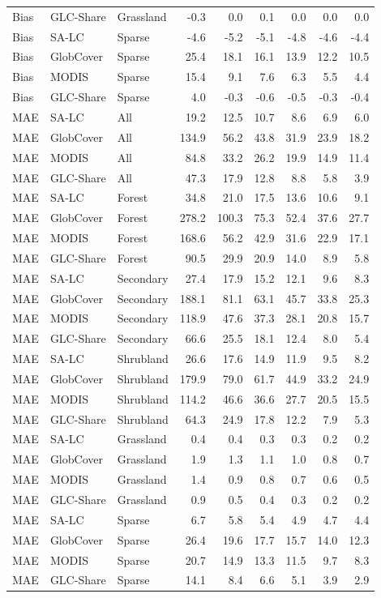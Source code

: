 \begin{longtable}{lllrrrrrr}
  Bias & GLC-Share & Grassland & -0.3 & 0.0 & 0.1 & 0.0 & 0.0 & 0.0 \\ 
  Bias & SA-LC & Sparse & -4.6 & -5.2 & -5.1 & -4.8 & -4.6 & -4.4 \\ 
  Bias & GlobCover & Sparse & 25.4 & 18.1 & 16.1 & 13.9 & 12.2 & 10.5 \\ 
  Bias & MODIS & Sparse & 15.4 & 9.1 & 7.6 & 6.3 & 5.5 & 4.4 \\ 
  Bias & GLC-Share & Sparse & 4.0 & -0.3 & -0.6 & -0.5 & -0.3 & -0.4 \\ 
  MAE & SA-LC & All & 19.2 & 12.5 & 10.7 & 8.6 & 6.9 & 6.0 \\ 
  MAE & GlobCover & All & 134.9 & 56.2 & 43.8 & 31.9 & 23.9 & 18.2 \\ 
  MAE & MODIS & All & 84.8 & 33.2 & 26.2 & 19.9 & 14.9 & 11.4 \\ 
  MAE & GLC-Share & All & 47.3 & 17.9 & 12.8 & 8.8 & 5.8 & 3.9 \\ 
  MAE & SA-LC & Forest & 34.8 & 21.0 & 17.5 & 13.6 & 10.6 & 9.1 \\ 
  MAE & GlobCover & Forest & 278.2 & 100.3 & 75.3 & 52.4 & 37.6 & 27.7 \\ 
  MAE & MODIS & Forest & 168.6 & 56.2 & 42.9 & 31.6 & 22.9 & 17.1 \\ 
  MAE & GLC-Share & Forest & 90.5 & 29.9 & 20.9 & 14.0 & 8.9 & 5.8 \\ 
  MAE & SA-LC & Secondary & 27.4 & 17.9 & 15.2 & 12.1 & 9.6 & 8.3 \\ 
  MAE & GlobCover & Secondary & 188.1 & 81.1 & 63.1 & 45.7 & 33.8 & 25.3 \\ 
  MAE & MODIS & Secondary & 118.9 & 47.6 & 37.3 & 28.1 & 20.8 & 15.7 \\ 
  MAE & GLC-Share & Secondary & 66.6 & 25.5 & 18.1 & 12.4 & 8.0 & 5.4 \\ 
  MAE & SA-LC & Shrubland & 26.6 & 17.6 & 14.9 & 11.9 & 9.5 & 8.2 \\ 
  MAE & GlobCover & Shrubland & 179.9 & 79.0 & 61.7 & 44.9 & 33.2 & 24.9 \\ 
  MAE & MODIS & Shrubland & 114.2 & 46.6 & 36.6 & 27.7 & 20.5 & 15.5 \\ 
  MAE & GLC-Share & Shrubland & 64.3 & 24.9 & 17.8 & 12.2 & 7.9 & 5.3 \\ 
  MAE & SA-LC & Grassland & 0.4 & 0.4 & 0.3 & 0.3 & 0.2 & 0.2 \\ 
  MAE & GlobCover & Grassland & 1.9 & 1.3 & 1.1 & 1.0 & 0.8 & 0.7 \\ 
  MAE & MODIS & Grassland & 1.4 & 0.9 & 0.8 & 0.7 & 0.6 & 0.5 \\ 
  MAE & GLC-Share & Grassland & 0.9 & 0.5 & 0.4 & 0.3 & 0.2 & 0.2 \\ 
  MAE & SA-LC & Sparse & 6.7 & 5.8 & 5.4 & 4.9 & 4.7 & 4.4 \\ 
  MAE & GlobCover & Sparse & 26.4 & 19.6 & 17.7 & 15.7 & 14.0 & 12.3 \\ 
  MAE & MODIS & Sparse & 20.7 & 14.9 & 13.3 & 11.5 & 9.7 & 8.3 \\ 
  MAE & GLC-Share & Sparse & 14.1 & 8.4 & 6.6 & 5.1 & 3.9 & 2.9 \\ 
   \hline
\hline
\end{longtable}
